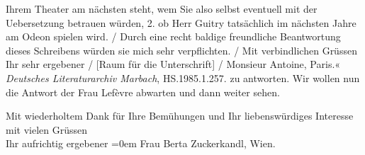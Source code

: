 {{{                        Ihrem Theater am nächsten steht, wem Sie also selbst eventuell mit der
                        Uebersetzung betrauen würden, 2. ob Herr Guitry tatsächlich im nächsten Jahre am Odeon spielen wird.{ / }Durch eine recht baldige freundliche Beantwortung dieses Schreibens würden
                        sie mich sehr verpflichten.{ / }Mit verbindlichen Grüssen{\\}Ihr sehr ergebener{ / }{[}Raum für die Unterschrift{]}{ / }Monsieur Antoine, Paris.« \emph{Deutsches Literaturarchiv Marbach},
                  HS.1985.1.257.}}}\label{K_L03951-3} zu antworten. {\pb}Wir wollen
               nun die Antwort der Frau Lefèvre abwarten und
               dann weiter sehen.\pend
           
\pstart
           Mit wiederholtem Dank für Ihre Bemühungen und Ihr liebenswürdiges Interesse mit
               vielen Grüssen{\\[\baselineskip]} Ihr aufrichtig ergebener\pend
           \leftskip=0em{}{\vspace{1\baselineskip}}
\pstart
           \noindent{}Frau Berta Zuckerkandl, Wien.\pend
           \endnumbering{}  \newcommand{\dateiname}{L03951}\newcommand{\titel}{Arthur Schnitzler an Berta Zuckerkandl, 9. 12. 1911}\newcommand{\editorInnen}{Herausgegeben von Jahnke, SelmaMüller, Martin Anton}
